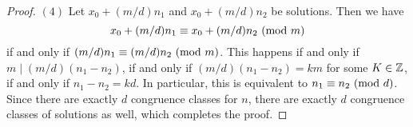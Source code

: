 \begin{proof}
  $(4)$ Let $x_0 + (m / d) n_1$ and
  $x_0 + (m / d) n_2$ be solutions.
  Then we have
  \[
    x_0 + (m / d) n_1
    \equiv x_0 + (m / d) n_2 \ (\mathrm{mod}\ m)
  \]
  if and only if
  $(m / d) n_1 \equiv (m / d) n_2 \ (\mathrm{mod}\ m)$.
  This happens if and only if
  $m \mid (m / d)(n_1 - n_2)$, if and only if
  $(m / d) (n_1 - n_2) = km$ for some
  $K \in \mathbb{Z}$, if and only if
  $n_1 - n_2 = kd$. In particular, this
  is equivalent to $n_1 \equiv n_2 \ (\mathrm{mod}\ d)$.
  Since there are exactly $d$ congruence
  classes for $n$, there are exactly $d$
  congruence classes of solutions as well,
  which completes the proof.
\end{proof}
